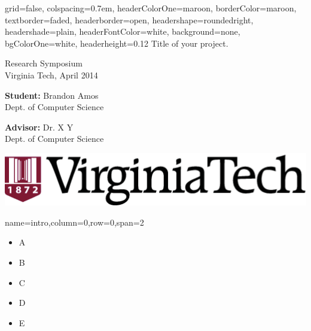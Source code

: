 \documentclass[landscape,specialSize,fontscale=0.3]{baposter}
\begin{document}
\begin{poster}{
  grid=false, %
  colspacing=0.7em, %
  headerColorOne=maroon, borderColor=maroon, %
  textborder=faded, %
  headerborder=open, headershape=roundedright,
  headershade=plain, headerFontColor=white,
  background=none, bgColorOne=white,
  headerheight=0.12\textheight
}{
}{
  \sc\Huge Title of your project.
}{
  \bigskip\large
  \begin{minipage}{0.3\textwidth}
    Research Symposium \\
    Virginia Tech, April 2014
  \end{minipage}
  \begin{minipage}{0.3\textwidth}
    {\bf Student:} Brandon Amos \\
    Dept. of Computer Science
  \end{minipage}
  \begin{minipage}{0.3\textwidth}
    {\bf Advisor:} Dr. X Y \\
    Dept. of Computer Science
  \end{minipage}
}{
  \includegraphics[height=0.05\textheight]{vtlogo-new}
}

    {name=intro,column=0,row=0,span=2}{
  \begin{itemize}
    \item A
    \item B
    \item C
    \item D
    \item E
  \end{itemize}
}


\end{poster}
\end{document}
